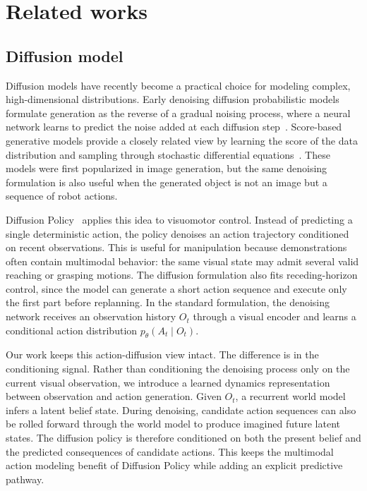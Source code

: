 \section{Related works}
\subsection{Diffusion model}

Diffusion models have recently become a practical choice for modeling complex, high-dimensional distributions. Early denoising diffusion probabilistic models formulate generation as the reverse of a gradual noising process, where a neural network learns to predict the noise added at each diffusion step~\cite{ddpm}. Score-based generative models provide a closely related view by learning the score of the data distribution and sampling through stochastic differential equations~\cite{score}. These models were first popularized in image generation, but the same denoising formulation is also useful when the generated object is not an image but a sequence of robot actions.

Diffusion Policy~\cite{dp} applies this idea to visuomotor control. Instead of predicting a single deterministic action, the policy denoises an action trajectory conditioned on recent observations. This is useful for manipulation because demonstrations often contain multimodal behavior: the same visual state may admit several valid reaching or grasping motions. The diffusion formulation also fits receding-horizon control, since the model can generate a short action sequence and execute only the first part before replanning. In the standard formulation, the denoising network receives an observation history $O_t$ through a visual encoder and learns a conditional action distribution $p_\theta(A_t \mid O_t)$.

Our work keeps this action-diffusion view intact. The difference is in the conditioning signal. Rather than conditioning the denoising process only on the current visual observation, we introduce a learned dynamics representation between observation and action generation. Given $O_t$, a recurrent world model infers a latent belief state. During denoising, candidate action sequences can also be rolled forward through the world model to produce imagined future latent states. The diffusion policy is therefore conditioned on both the present belief and the predicted consequences of candidate actions. This keeps the multimodal action modeling benefit of Diffusion Policy while adding an explicit predictive pathway.

